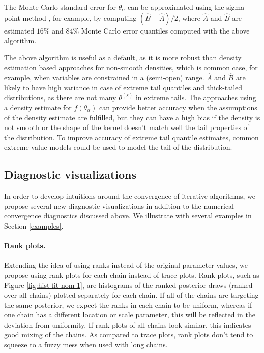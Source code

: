 \documentclass[american,]{article}
\let\oldparagraph\paragraph
\renewcommand{\paragraph}[1]{\oldparagraph{#1}\mbox{}}
\theoremstyle{definition}
\begin{document}
The Monte Carlo standard error for \(\hat{\theta}_\alpha\) can be
approximated using the sigma point method \citep{wan2000unscented},
for example, by computing $(\widehat{B}-\widehat{A})/2$, where $\widehat{A}$ and
$\widehat{B}$ are estimated \(16\%\) and \(84\%\) Monte Carlo error
quantiles computed with the above algorithm.

The above algorithm is useful as a default, as it is more robust than
density estimation based approaches for
non-smooth densities, which is common case, for example, when
variables are constrained in a (semi-open) range.  $\widehat{A}$ and $\widehat{B}$ are likely
to have high variance in case of extreme tail quantiles and thick-tailed distributions,
as there are not many $\theta^{(s)}$ in extreme
tails. The approaches using a density estimate for \(f(\theta_\alpha)\)
can provide better accuracy when the assumptions of the density estimate
are fulfilled, but they can have a high bias if the density is not
smooth or the shape of the kernel doesn't match well the tail
properties of the distribution. To improve accuracy of extreme tail
quantile estimates, common extreme value models could be used to model
the tail of the distribution.

\hypertarget{diagnostic-visualizations}{%
\subsection{Diagnostic visualizations}\label{diagnostic-visualizations}}

In order to develop intuitions around the convergence of iterative algorithms, we
propose several new diagnostic visualizations in addition to the numerical
convergence diagnostics discussed above. We illustrate with several examples in Section
\ref{examples}.

\hypertarget{rank-plots}{%
\paragraph{Rank plots.}\label{rank-plots}}
Extending the idea of using ranks instead of the original parameter
values, we propose using rank plots for each chain instead
of trace plots. Rank plots, such as Figure \ref{fig:hist-fit-nom-1}, are histograms of the
ranked posterior draws (ranked over all chains) plotted separately for
each chain. If all of the chains are targeting the same posterior, we expect the 
ranks in each chain to be uniform, whereas if one chain has a different location
or scale parameter, this will be reflected in the deviation from uniformity. 
 If rank plots of all chains look similar, this indicates
good mixing of the chains. As compared to trace plots, rank plots don't
tend to squeeze to a fuzzy mess when used with long chains.
\end{document}
